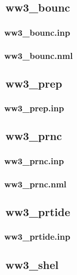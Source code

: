 \vssub
\subsection{~ww3\_bounc}
\vsssub
\subsubsection{~ww3\_bounc.inp} \label{sec:config041}
\vsssub
\vsssub
\subsubsection{~ww3\_bounc.nml} \label{sec:config042}
\vsssub
\vssub

\vssub
\subsection{~ww3\_prep}
\vsssub
\subsubsection{~ww3\_prep.inp} \label{sec:config051}
\vsssub
\vssub

\vssub
\subsection{~ww3\_prnc}
\vsssub
\subsubsection{~ww3\_prnc.inp} \label{sec:config061}
\vsssub
\vsssub
\subsubsection{~ww3\_prnc.nml} \label{sec:config062}
\vsssub
\vssub

\vssub
\subsection{~ww3\_prtide}
\vsssub
\subsubsection{~ww3\_prtide.inp} \label{sec:config071}
\vsssub
\vssub

\vssub
\subsection{~ww3\_shel}
\vsssub
